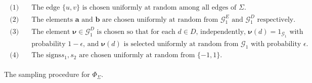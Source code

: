 \documentclass[a4paper,11pt]{article}
\theoremstyle{definition}
\newcommand{\tuple}[1]{{\mathbf{#1}}}
\newcommand{\gr}{\mathscr{G}}
\newcommand{\groupid}{1}
\begin{document}
\begin{figure}[ht]
    \centering
\begin{align*}
\boxed{
\begin{array}{llllll}
\mbox{($1$)}\quad & \text{The
edge $\{u,v\}$ is chosen uniformly at random among all edges of $\Sigma$.}
\\[0.5em]
\mbox{($2$)}\quad & 
\text{The elements $\tuple{a}$ and $\tuple{b}$ are chosen uniformly at random from $\gr_1^E$ and $\gr_1^D$ respectively.}
\\[0.5em]
\mbox{($3$)}\quad &
\text{The element $\bm{\nu}\in \gr_1^D$ is chosen so that for each $d\in D$, independently, 
$\bm{\nu}(d)=\groupid_{\gr_1}$ with} \\ & \text{probability $1-\epsilon$, and $\bm{\nu}(d)$ is selected uniformly at random from $\gr_1$  with probability $\epsilon$.}\\[0.5em]
\mbox{($4$)}\quad & \text{The signs
$s_1,s_2$ are chosen uniformly at random from $\{-1,1\}$.}
\end{array}
}
\end{align*}
 \caption{The sampling procedure for $\Phi_\Sigma$.}
 \label{fig:probs-reduction}
\end{figure}
\end{document}
